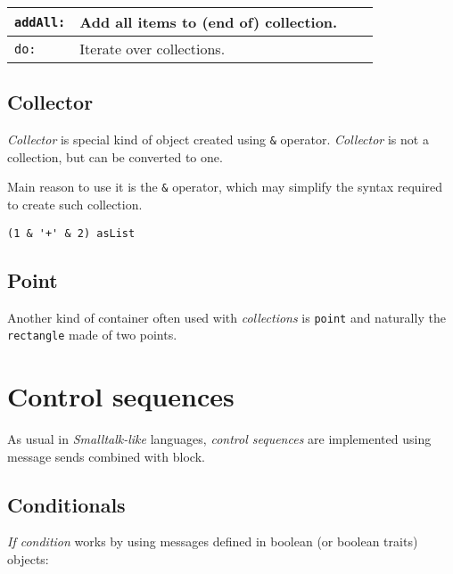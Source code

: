 \documentclass[10pt]{article}
\begin{document}
\begin{multicols*}{3}
{\begin{tabular}{ p{50pt} p{180pt} l l }
\texttt{addAll:}
&
Add all items to (end of) collection.
\\\hline %

\texttt{do:}
&
Iterate over collections.
\\ %
\end{tabular}}



\subsection{Collector}

\textit{Collector} is special kind of object created using \texttt{\&} operator. \textit{Collector} is not a collection, but can be converted to one.

Main reason to use it is the \texttt{\&} operator, which may simplify the syntax required to create such collection.

\nointerlineskip\begin{lstlisting}
(1 & '+' & 2) asList
\end{lstlisting}\nointerlineskip



\subsection{Point}
Another kind of container often used with \textit{collections} is \texttt{point} and naturally the \texttt{rectangle} made of two points.




\vfill
\columnbreak
\section{Control sequences}
As usual in \textit{Smalltalk-like} languages, \textit{control sequences} are implemented using message sends combined with block.




\subsection{Conditionals}
\textit{If condition} works by using messages defined in boolean (or boolean traits) objects:


\end{multicols*}
\end{document}

